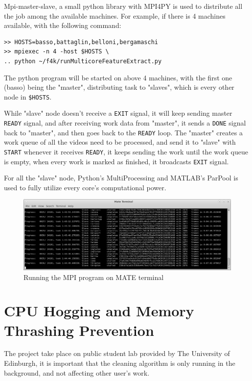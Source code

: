 \documentclass[bsc,logo,twoside,fullspacing,parskip]{infthesis}
\begin{document}
Mpi-master-slave, a small python library with MPI4PY is used to distribute all the job among the available machines. 
For example, if there is 4 machines available, with the following command: 
\lstset{basicstyle=\footnotesize\ttfamily,breaklines=true}
\begin{lstlisting}[frame=single]
>> HOSTS=basso,battaglin,belloni,bergamaschi
>> mpiexec -n 4 -host $HOSTS \
.. python ~/f4k/runMulticoreFeatureExtract.py
\end{lstlisting}
The python program will be started on above 4 machines, with the first one (basso) being the "master", distributing task to "slaves", which is every other node in {\tt \$HOSTS}. 

While "slave" node doesn't receive a {\tt EXIT} signal, it will keep sending master {\tt READY} signal, and after receiving work data from "master", it sends a {\tt DONE} signal back to "master", and then goes back to the {\tt READY} loop. The "master" creates a work queue of all the videos need to be processed, and send it to "slave" with {\tt START} whenever it receives {\tt READY}, it keeps sending the work until the work queue is empty, when every work is marked as finished, it broadcasts {\tt EXIT} signal.

For all the "slave" node, Python's MultiProcessing and MATLAB's ParPool is used to fully utilize every core's computational power.

\begin{figure}[!b]
    \centering
    \includegraphics[scale=0.35]{graph/sample_terminal.png}
    \caption{Running the MPI program on MATE terminal}
    \label{fig:mpi}
\end{figure}

\section{CPU Hogging and Memory Thrashing Prevention}

The project take place on public student lab provided by The University of Edinburgh, it is important that the cleaning algorithm is only running in the background, and not affecting other user's work.
\end{document}
